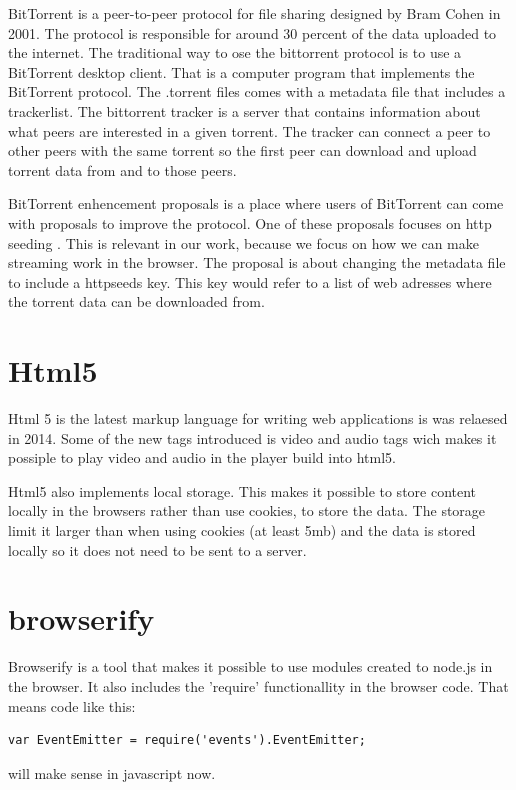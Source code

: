 BitTorrent is a peer-to-peer protocol for file sharing designed by Bram Cohen in 2001.
The protocol is responsible for around 30 percent of the data uploaded to the internet.
The traditional way to ose the bittorrent protocol is to use a BitTorrent desktop client. That is a computer program that implements the BitTorrent protocol.
The .torrent files comes with a metadata file that includes a trackerlist. The bittorrent tracker is a server that contains information about what peers are interested in a given torrent. The tracker can connect a peer to other peers with the same torrent so the first peer can download and upload torrent data from and to those peers.


BitTorrent enhencement proposals is a place where users of BitTorrent can come with proposals to improve the protocol.
One of these proposals focuses on http seeding \citep{httpSeed}.
This is relevant in our work, because we focus on how we can make streaming work in the browser. The proposal is about changing the metadata file to include a httpseeds key. This key would refer to a list of web adresses where the torrent data can be downloaded from.

\section{Html5}
Html 5 is the latest markup language for writing web applications is was relaesed in 2014. Some of the new tags introduced is video and audio tags wich makes it possiple to play video and audio in the player build into html5.

Html5 also implements local storage. This makes it possible to store content locally in the browsers rather than use cookies, to store the data.
The storage limit it larger than when using cookies (at least 5mb) and the data is stored locally so it does not need to be sent to a server.

\section{browserify}
Browserify is a tool that makes it possible to use modules created to node.js in the browser. It also includes the 'require' functionallity in the browser code. That means code like this:
\begin{verbatim}
var EventEmitter = require('events').EventEmitter;
\end{verbatim}
will make sense in javascript now.

